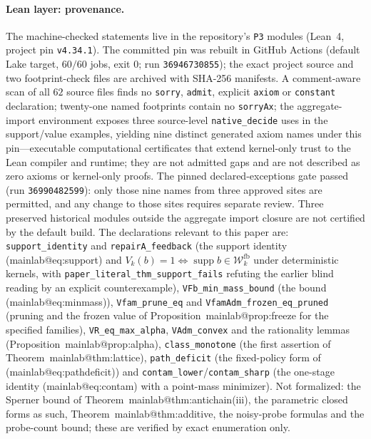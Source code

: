 \documentclass[11pt,a4paper]{article}
\makeatletter
\theoremstyle{plain}
\theoremstyle{definition}
\theoremstyle{remark}
\newcommand{\calW}{\mathcal{W}}
\newcommand{\Wfb}{\calW^{\mathrm{fb}}}
\newcommand{\supp}{\operatorname{supp}}
\newcommand{\mref}[1]{\csname mainlab@#1\endcsname}
\newcommand{\meqref}[1]{(\mref{#1})}
\makeatother
\begin{document}
\paragraph{Lean layer: provenance.} The machine-checked statements live in the repository's \texttt{P3} modules (Lean~4, project pin \texttt{v4.34.1}). The committed pin was rebuilt in GitHub Actions (default Lake target, $60/60$ jobs, exit $0$; run \texttt{36946730855}); the exact project source and two footprint-check files are archived with SHA-256 manifests. A comment-aware scan of all $62$ source files finds no \texttt{sorry}, \texttt{admit}, explicit \texttt{axiom} or \texttt{constant} declaration; twenty-one named footprints contain no \texttt{sorryAx}; the aggregate-import environment exposes three source-level \texttt{native\_decide} uses in the support/value examples, yielding nine distinct generated axiom names under this pin---executable computational certificates that extend kernel-only trust to the Lean compiler and runtime; they are not admitted gaps and are not described as zero axioms or kernel-only proofs. The pinned declared-exceptions gate passed (run \texttt{36990482599}): only those nine names from three approved sites are permitted, and any change to those sites requires separate review. Three preserved historical modules outside the aggregate import closure are not certified by the default build. The declarations relevant to this paper are: \texttt{support\_identity} and \texttt{repairA\_feedback} (the support identity \meqref{eq:support} and $V_k(b)=1\iff\supp b\in\Wfb_k$ under deterministic kernels, with \texttt{paper\_literal\_thm\_support\_fails} refuting the earlier blind reading by an explicit counterexample), \texttt{VFb\_min\_mass\_bound} (the bound \meqref{eq:minmass}), \texttt{Vfam\_prune\_eq} and \texttt{VfamAdm\_frozen\_eq\_pruned} (pruning and the frozen value of Proposition~\mref{prop:freeze} for the specified families), \texttt{VR\_eq\_max\_alpha}, \texttt{VAdm\_convex} and the rationality lemmas (Proposition~\mref{prop:alpha}), \texttt{class\_monotone} (the first assertion of Theorem~\mref{thm:lattice}), \texttt{path\_deficit} (the fixed-policy form of \meqref{eq:pathdeficit}) and \texttt{contam\_lower}/\texttt{contam\_sharp} (the one-stage identity \meqref{eq:contam} with a point-mass minimizer). Not formalized: the Sperner bound of Theorem~\mref{thm:antichain}(iii), the parametric closed forms as such, Theorem~\mref{thm:additive}, the noisy-probe formulas and the probe-count bound; these are verified by exact enumeration only.
\end{document}
